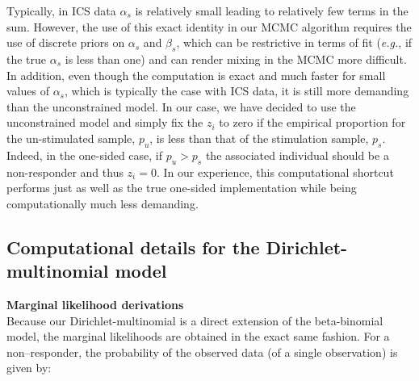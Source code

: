 \documentclass{article}
\begin{document}
Typically, in ICS data $\alpha_s$ is relatively small leading to relatively few terms in the sum. However, the use of this exact identity in our MCMC algorithm requires the use of discrete priors on $\alpha_s$ and $\beta_s$, which can be restrictive in terms of fit (\textit{e.g.},  if the true $\alpha_s$ is less than one) and can render mixing in the MCMC more difficult. In addition, even though the computation is exact and much faster for small values of $\alpha_s$, which is typically the case with ICS data, it is still more demanding than the unconstrained model. In our case, we have decided to use the unconstrained model and simply fix the $z_i$ to zero if the empirical proportion for the un-stimulated sample, $p_u$, is less than that of the stimulation sample, $p_s$. Indeed, in the one-sided case, if $p_u>p_s$ the associated individual should be a non-responder and thus $z_i=0$. In our experience, this computational shortcut performs just as well as the true one-sided implementation while being computationally much less demanding.  

\subsection{Computational details for the Dirichlet-multinomial model}
\noindent\textbf{Marginal likelihood derivations}\\
Because our Dirichlet-multinomial is a direct extension of the beta-binomial model, the marginal likelihoods are obtained in the exact same fashion. For a non--responder, the probability of the observed data (of a single observation) is given by:
\end{document}
